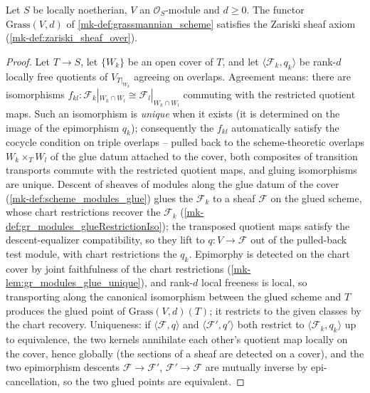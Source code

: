 \begin{lemma}\label{mk-lem:grassmannian_zariski_sheaf}
  \leanok

  Let \(S\) be locally noetherian, \(V\) an \(\mathcal{O}_S\)-module and
  \(d \ge 0\).  The functor \(\mathrm{Grass}(V, d)\) of
  \ref{mk-def:grassmannian_scheme} satisfies the Zariski sheaf axiom
  (\ref{mk-def:zariski_sheaf_over}).
\end{lemma}

\begin{proof}
  \leanok{}
  Let \(T \to S\), let \(\{W_k\}\) be an open cover of \(T\), and let
  \(\langle \mathcal{F}_k, q_k \rangle\) be rank-\(d\) locally free
  quotients of \(V_{T|_{W_k}}\) agreeing on overlaps.  Agreement means:
  there are isomorphisms
  \(f_{kl} : \mathcal{F}_k|_{W_k \cap W_l} \cong \mathcal{F}_l|_{W_k \cap W_l}\)
  commuting with the restricted quotient maps.  Such an isomorphism is
  \emph{unique} when it exists (it is determined on the image of the
  epimorphism \(q_k\)); consequently the \(f_{kl}\) automatically satisfy
  the cocycle condition on triple overlaps -- pulled back to the
  scheme-theoretic overlaps \(W_k \times_T W_l\) of the glue datum attached
  to the cover, both composites of transition transports commute with the
  restricted quotient maps, and gluing isomorphisms are unique.  Descent of
  sheaves of modules along the glue datum of the cover
  (\ref{mk-def:scheme_modules_glue}) glues the \(\mathcal{F}_k\) to a sheaf
  \(\mathcal{F}\) on the glued scheme, whose chart restrictions recover the
  \(\mathcal{F}_k\) (\ref{mk-def:gr_modules_glueRestrictionIso}); the
  transposed quotient maps satisfy the descent-equalizer compatibility, so
  they lift to \(q : V \to \mathcal{F}\) out of the pulled-back test module,
  with chart restrictions the \(q_k\).  Epimorphy is detected on the chart
  cover by joint faithfulness of the chart restrictions
  (\ref{mk-lem:gr_modules_glue_unique}), and rank-\(d\) local freeness is
  local, so transporting along the canonical isomorphism between the glued
  scheme and \(T\) produces the glued point of
  \(\mathrm{Grass}(V,d)(T)\); it restricts to the given classes by the
  chart recovery.  Uniqueness: if \(\langle \mathcal{F}, q \rangle\) and
  \(\langle \mathcal{F}', q' \rangle\) both restrict to
  \(\langle \mathcal{F}_k, q_k \rangle\) up to equivalence, the two kernels
  annihilate each other's quotient map locally on the cover, hence globally
  (the sections of a sheaf are detected on a cover), and the two
  epimorphism descents \(\mathcal{F} \to \mathcal{F}'\),
  \(\mathcal{F}' \to \mathcal{F}\) are mutually inverse by
  epi-cancellation, so the two glued points are equivalent.
\end{proof}

